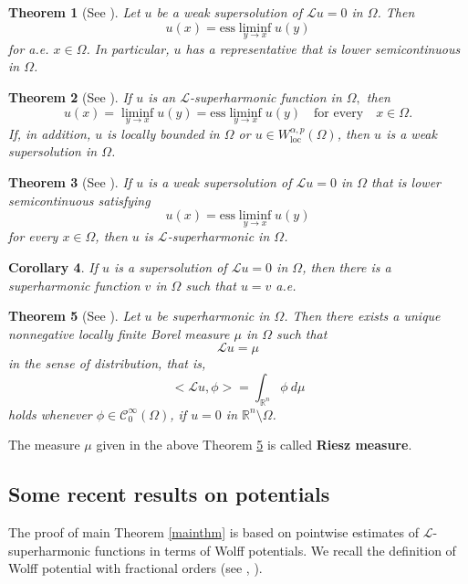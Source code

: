 \documentclass[12pt]{amsart}
\newcommand{\R}{\mathbb{R}}
\numberwithin{equation}{section}
\theoremstyle{plain}
\newtheorem{Thm}{Theorem}[section]
\newtheorem{Cor}[Thm]{Corollary}
\theoremstyle{definition}
\theoremstyle{remark}
\begin{document}
\begin{Thm}   [{\text See \cite{kimlee}}]    \label{thm:propsuper1} 
Let $u$ be a weak supersolution of $\mathcal{L}u=0$ in $\Omega$. Then
\[
u(x)= \mathrm{ess}\liminf_{{y\to x}} u(y)
\]
for a.e. $x\in\Omega$. In particular, $u$ has a representative that is lower semicontinuous in $\Omega$.
\end{Thm}

\begin{Thm}   [{\text See \cite{kimlee}}]    \label{thm:propsuper2} 
If $u$ is an $\mathcal{L}$-superharmonic function in $\Omega,$ then 
\[
u(x)= \liminf_{{{y\to x}} } u(y)= \mathrm{ess}\liminf_{{y\to x}} u(y)\quad\text{for every}\quad x\in\Omega.
\]
If, in addition, $u$ is locally bounded in $\Omega$ or $u\in W_{\mathrm{loc}}^{\alpha,p}(\Omega)$, then $u$ is a weak supersolution in $\Omega$.
\end{Thm}

\begin{Thm}   [{\text See \cite{kimlee}}]    \label{thm:propsuper3} 
If $u$ is a  weak supersolution of $\mathcal{L}u=0$ in $\Omega$ that is lower semicontinuous  satisfying
\[
u(x)= \mathrm{ess}\liminf_{{y\to x}} u(y)
\]
for every $x\in\Omega$, then $u$ is $\mathcal{L}$-superharmonic in $\Omega$.
\end{Thm}

\begin{Cor}
If $u$ is a supersolution of $\mathcal{L}u=0$ in $\Omega$, then there is a superharmonic function $v$ in $\Omega$ such that $u=v$ a.e.
\end{Cor}

\begin{Thm}   [{\text See \cite{MKS}}]    \label{thm:rieszmeasure} 
Let $u$ be superharmonic  in $\Omega$. Then there exists a unique nonnegative locally finite Borel measure $\mu$ in $\Omega$ such that
\[
\mathcal{L}u=\mu
\]
in the sense of distribution, that is,
\[
<\mathcal{L}u,\phi>=\int_{{\R}^{n}} \phi \ d\mu
\]
holds whenever $\phi\in\mathcal{C}^{\infty}_{0}(\Omega)$, if $u=0$ in $\R^{n}\setminus\Omega$.
\end{Thm}
The measure $\mu$ given in the above Theorem \ref{thm:rieszmeasure} is called \textbf{Riesz measure}.



\subsection*{Some recent results on potentials}
The proof of main Theorem \ref{mainthm} is based on pointwise estimates of $\mathcal{L}$-superharmonic functions in terms of Wolff potentials. We recall the definition of Wolff potential with fractional orders (see \cite{AH}, \cite{KMS}).
\end{document}
